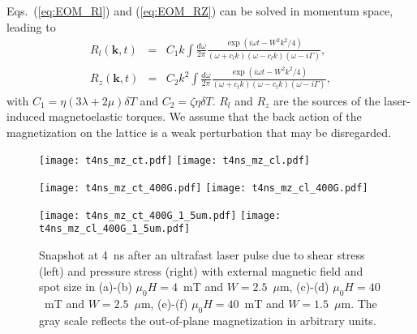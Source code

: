 \documentclass[aps,prb,twocolumn,superscriptaddress,floatfix]{revtex4}%
\def\ber{\begin{eqnarray}}
\def\eer{\end{eqnarray}}
\begin{document}
Eqs.~(\ref{eq:EOM_Rl}) and (\ref{eq:EOM_RZ}) can be solved in momentum space, leading to
\ber
 R_{l}(\mathbf{k},t)&=& C_1 k\int\frac{d\omega}{2\pi}\frac{\exp({i\omega t-W^{2}k^{2}/4})}{(\omega+c_{l}k)(\omega-c_{l}k)(\omega-i\Gamma)},\label{eq:Rl_kt}\\
 R_{z}(\mathbf{k},t)&=& C_2 k^{2}\int\frac{d\omega}{2\pi}\frac{\exp(i\omega t-W^{2}k^{2}/4)}{(\omega+c_{t}k)(\omega-c_{t}k)(\omega-i\Gamma)},\label{eq:Rz_kt}
\eer
with $C_1=\eta (3\lambda+2\mu) \delta T$ and $C_2=\zeta\eta \delta T$.  $R_l$ and $R_z$ are the sources of the laser-induced magnetoelastic torques. We assume that the back action of the magnetization on the lattice is a weak perturbation that may be disregarded.


\begin{figure}[ptb]
\texttt{[image: t4ns\_mz\_ct.pdf]}
\texttt{[image: t4ns\_mz\_cl.pdf]}

\texttt{[image: t4ns\_mz\_ct\_400G.pdf]}
\texttt{[image: t4ns\_mz\_cl\_400G.pdf]}

\texttt{[image: t4ns\_mz\_ct\_400G\_1\_5um.pdf]}
\texttt{[image: t4ns\_mz\_cl\_400G\_1\_5um.pdf]}

\caption{Snapshot at 4~ns after an ultrafast laser pulse due to shear stress (left) and pressure stress (right) with external magnetic field and spot size in (a)-(b) $\mu_0 H=4$~mT and $W=2.5$~$\mu$m, (c)-(d) $\mu_0 H=40$~mT and $W=2.5$~$\mu$m, (e)-(f) $\mu_0 H=40$~mT and $W=1.5$~$\mu$m. The gray scale reflects the out-of-plane magnetization in arbitrary units. }%
\label{Mechanisms}%
\end{figure}
\end{document}
